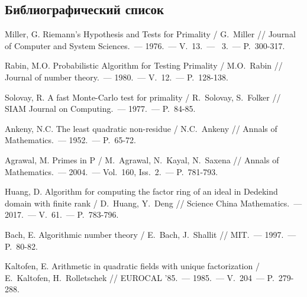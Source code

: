 \documentclass[_00_dissertation.tex]{subfiles}
\begin{document}

\renewcommand{\bibname}{Список использованных источников}

\begin{thebibliography}{99}
\section*{Библиографический список}
\vspace{-12pt}

    Miller, G. Riemann's Hypothesis and Tests for Primality / G.~Miller // Journal of Computer and System Sciences.~--- 1976.~--- V.~13.~--- ~3.~--- P.~300-317.

    Rabin, M.O. Probabilistic Algorithm for Testing Primality / M.O.~Rabin // Journal of number theory.~--- 1980.~--- V.~12.~--- P.~128-138.

    Solovay, R. A fast Monte-Carlo test for primality / R.~Solovay, S.~Folker // SIAM Journal on Computing.~--- 1977.~--- P.~84-85.

    Ankeny, N.C. The least quadratic non-residue / N.C.~Ankeny // Annals of Mathematics.~--- 1952.~--- P.~65-72.

    Agrawal, M. Primes in P / M.~Agrawal, N.~Kayal, N.~Saxena // Annals of Mathematics.~--- 2004.~--- Vol.~160, Iss.~2.~--- P.~781-793.

    Huang, D. Algorithm for computing the factor ring of an ideal in Dedekind domain with finite rank / D.~Huang, Y.~Deng // Science China Mathematics.~--- 2017.~--- V.~61.~--- P.~783-796.

    Bach, E. Algorithmic number theory / E.~Bach, J.~Shallit // MIT.~--- 1997.~--- P.~80-82.

    Kaltofen, E. Arithmetic in quadratic fields with unique factorization / E.~Kaltofen, H.~Rolletschek // EUROCAL '85.~--- 1985.~--- V.~204~--- P.~279-288.


\end{thebibliography}
\end{document}
